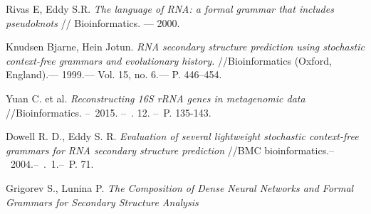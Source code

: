 \documentclass[12pt]{article}  %
\theoremstyle{definition}
\theoremstyle{remark}
\begin{document}
 

\begin{thebibliography}{4}

Rivas E, Eddy S.R. \emph{The language of RNA: a formal grammar that includes pseudoknots} // Bioinformatics. –– 2000.

Knudsen Bjarne, Hein Jotun. 
\emph{RNA secondary structure prediction using stochastic context-free grammars and evolutionary history.} //Bioinformatics (Oxford, England).–– 1999.–– Vol. 15, no. 6.–– P. 446–454.

Yuan C. et al. \emph{Reconstructing 16S rRNA genes in metagenomic data} //Bioinformatics. --~2015. --~\textnumero. 12. --~P. 135-143.

Dowell R. D., Eddy S. R. 
\emph{Evaluation of several lightweight stochastic context-free grammars for RNA secondary structure prediction} //BMC bioinformatics.--~2004.--~\textnumero .~1.--~P. 71.

Grigorev S., Lunina P.
\emph{The Composition of Dense Neural Networks and Formal Grammars for Secondary Structure Analysis}

\end{thebibliography}
\end{document}
